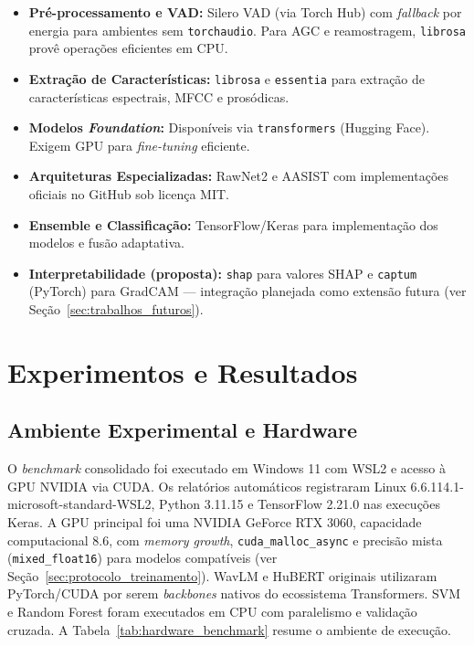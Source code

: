 \documentclass[12pt,a4paper]{article}
\begin{document}
\begin{itemize}
    \item \textbf{Pré-processamento e VAD:} Silero VAD (via Torch Hub) com
    \textit{fallback} por energia para ambientes sem \texttt{torchaudio}. Para
    AGC e reamostragem, \texttt{librosa} provê operações eficientes em CPU.
    \item \textbf{Extração de Características:} \texttt{librosa} e
    \texttt{essentia} para extração de características espectrais, MFCC e
    prosódicas.
    \item \textbf{Modelos \textit{Foundation}:} Disponíveis via
    \texttt{transformers} (Hugging Face). Exigem GPU para \textit{fine-tuning}
    eficiente.
    \item \textbf{Arquiteturas Especializadas:} RawNet2 e AASIST com
    implementações oficiais no GitHub sob licença MIT.
    \item \textbf{Ensemble e Classificação:} TensorFlow/Keras para
    implementação dos modelos e fusão adaptativa.
    \item \textbf{Interpretabilidade (proposta):} \texttt{shap} para valores
    SHAP \cite{lundberg2017unified} e \texttt{captum} (PyTorch) para GradCAM
    --- integração planejada
    como extensão futura (ver Seção~\ref{sec:trabalhos_futuros}).
\end{itemize}

\section{Experimentos e Resultados}
\label{sec:resultados}

\subsection{Ambiente Experimental e Hardware}

O \textit{benchmark} consolidado foi executado em Windows 11 com WSL2 e acesso
à GPU NVIDIA via CUDA. Os relatórios automáticos registraram Linux
6.6.114.1-microsoft-standard-WSL2, Python 3.11.15 e TensorFlow 2.21.0 nas
execuções Keras. A GPU principal foi uma NVIDIA GeForce RTX 3060, capacidade
computacional 8.6, com \textit{memory growth}, \texttt{cuda\_malloc\_async} e
precisão mista (\texttt{mixed\_float16}) para modelos compatíveis (ver
Seção~\ref{sec:protocolo_treinamento}). WavLM e HuBERT originais utilizaram
PyTorch/CUDA por serem \textit{backbones} nativos do ecossistema Transformers.
SVM e Random Forest foram executados em CPU com paralelismo e validação cruzada.
A Tabela~\ref{tab:hardware_benchmark} resume o ambiente de execução.
\end{document}
